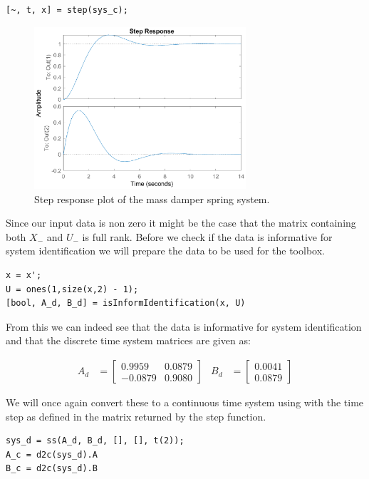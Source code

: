 \begin{lstlisting}
[~, t, x] = step(sys_c);
\end{lstlisting}

\begin{figure}[H]
	\centering
	\includegraphics[width=0.7\textwidth]{step_response_msd.eps}
	\caption{Step response plot of the mass damper spring system.}
\end{figure}

Since our input data is non zero it might be the case that the matrix containing both $X_-$ and $U_-$ is full rank. Before we check if the data is informative for system identification we will prepare the data to be used for the toolbox.

\begin{lstlisting}
x = x';
U = ones(1,size(x,2) - 1);
[bool, A_d, B_d] = isInformIdentification(x, U)
\end{lstlisting}

From this we can indeed see that the data is informative for system identification and that the discrete time system matrices are given as:

\begin{align*}
	A_d &= \begin{bmatrix} 0.9959 & 0.0879 \\ -0.0879 & 0.9080 \end{bmatrix} &
	B_d &= \begin{bmatrix} 0.0041 \\ 0.0879 \end{bmatrix} 
\end{align*}

We will once again convert these to a continuous time system using  with the time step as defined in the  matrix returned by the step function.

\begin{lstlisting}
sys_d = ss(A_d, B_d, [], [], t(2));
A_c = d2c(sys_d).A
B_c = d2c(sys_d).B
\end{lstlisting}

